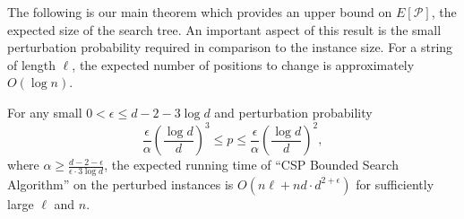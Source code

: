 The following is our main theorem which provides an upper bound on $E[\mathcal{P}]$, the expected size of the search tree.  An important aspect of this result is the small perturbation probability required in comparison to the instance size.  For a string of length $\ell$, the expected number of positions to change is approximately $O(\log n)$. 

\begin{theorem}  For any small $0 < \epsilon \leq d - 2 - 3 \log d$ and perturbation probability $$\frac{\epsilon}{\alpha} \left( \frac{\log d}{d} \right)^3 \leq p \leq \frac{\epsilon}{\alpha} \left( \frac{\log d}{d} \right)^2,$$ where $\alpha \geq \frac{d - 2 - \epsilon}{\epsilon \cdot 3 \log d}$, the expected running time of ``CSP Bounded Search Algorithm'' on the perturbed instances is $O(n \ell + n d \cdot d^{2 + \epsilon})$ for sufficiently large $\ell$ and $n$. \end{theorem}

